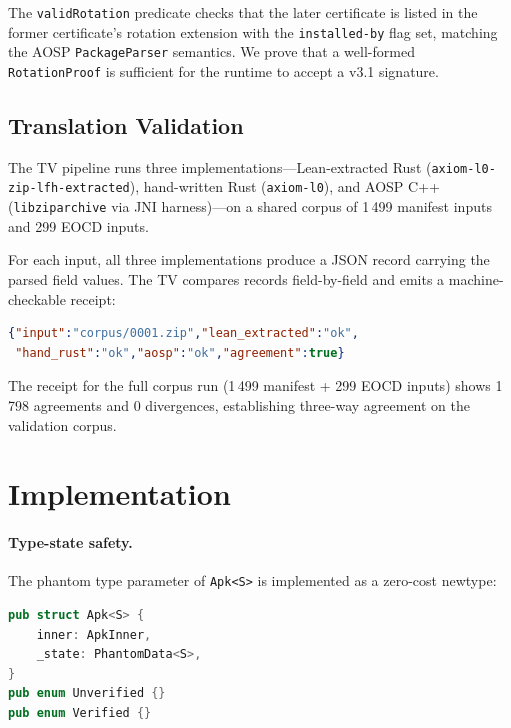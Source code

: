 \documentclass[runningheads]{llncs}
\begin{document}
The \texttt{validRotation} predicate checks that the later certificate is
listed in the former certificate's rotation extension with the
\texttt{installed-by} flag set, matching the AOSP \texttt{PackageParser}
semantics.  We prove that a well-formed \texttt{RotationProof} is sufficient
for the runtime to accept a v3.1 signature.

\subsection{Translation Validation}

The TV pipeline runs three implementations—Lean-extracted Rust
(\texttt{axiom-l0-zip-lfh-extracted}), hand-written Rust (\texttt{axiom-l0}),
and AOSP C++ (\texttt{libziparchive} via JNI harness)—on a shared corpus of
1\,499 manifest inputs and 299 EOCD inputs.

For each input, all three implementations produce a JSON record carrying the
parsed field values.  The TV compares records field-by-field and emits a
machine-checkable receipt:

\begin{lstlisting}[language=json]
{"input":"corpus/0001.zip","lean_extracted":"ok",
 "hand_rust":"ok","aosp":"ok","agreement":true}
\end{lstlisting}

The receipt for the full corpus run (1\,499 manifest + 299 EOCD inputs) shows
1\,798 agreements and 0 divergences, establishing three-way agreement on the
validation corpus.

\section{Implementation}
\label{sec:impl}

\paragraph{Type-state safety.}
The phantom type parameter of \texttt{Apk<S>} is implemented as a
zero-cost newtype:

\begin{lstlisting}[language=rust]
pub struct Apk<S> {
    inner: ApkInner,
    _state: PhantomData<S>,
}
pub enum Unverified {}
pub enum Verified {}
\end{lstlisting}
\end{document}
